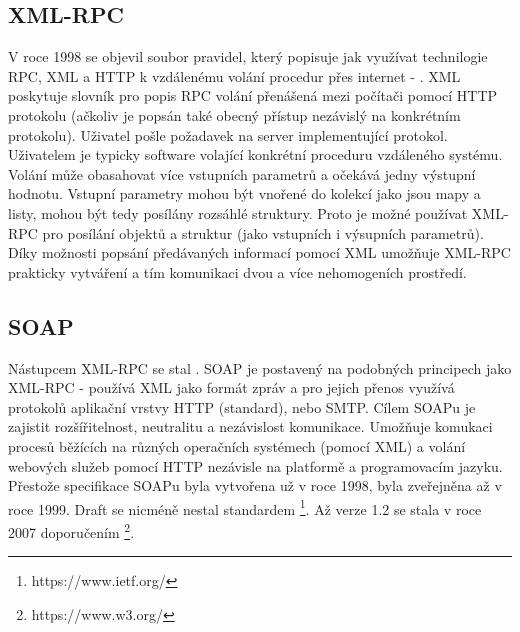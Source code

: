 \subsection{XML-RPC}
V roce 1998 se objevil soubor pravidel, který popisuje jak využívat technilogie RPC, XML a HTTP k vzdálenému volání procedur přes internet - .\cite{Winner99} XML poskytuje slovník pro popis RPC volání přenášená mezi počítači pomocí HTTP protokolu (ačkoliv je popsán také obecný přístup nezávislý na konkrétním protokolu). Uživatel pošle požadavek na server implementující protokol. Uživatelem je typicky software volající konkrétní proceduru vzdáleného systému. Volání může obasahovat více vstupních parametrů a očekává jedny výstupní hodnotu. Vstupní parametry mohou být vnořené do kolekcí jako jsou mapy a listy, mohou být tedy posílány rozsáhlé struktury. Proto je možné používat XML-RPC pro posílání objektů a struktur (jako vstupních i výsupních parametrů). Díky možnosti popsání předávaných informací pomocí XML umožňuje XML-RPC prakticky vytváření  a tím komunikaci dvou a více nehomogeních prostředí.\cite{Laurent01}  

\subsection{SOAP}
Nástupcem XML-RPC se stal . SOAP je postavený na podobných principech jako XML-RPC - používá XML jako formát zpráv a pro jejich přenos využívá protokolů aplikační vrstvy HTTP (standard), nebo SMTP. Cílem SOAPu je zajistit rozšířitelnost, neutralitu a nezávislost komunikace. Umožňuje komukaci procesů běžících na různých operačních systémech (pomocí XML) a volání webových služeb pomocí HTTP nezávisle na platformě a programovacím jazyku. 
Přestože specifikace SOAPu byla vytvořena už v roce 1998, byla zveřejněna až v roce 1999. Draft se nicméně nestal standardem \footnote{https://www.ietf.org/}.\cite{Box01} Až verze 1.2 se stala v roce 2007 doporučením \footnote{https://www.w3.org/}.\cite{W3C07}

